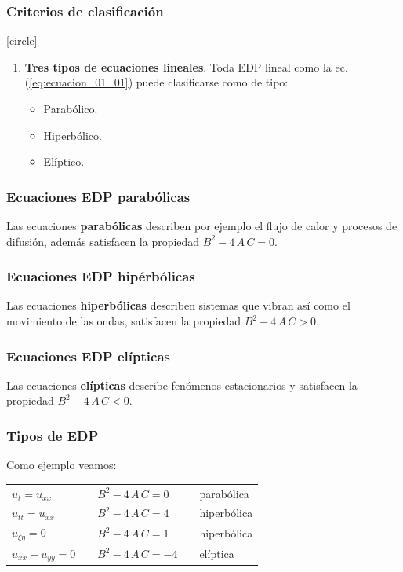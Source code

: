 \documentclass[12pt]{beamer}
\begin{document}
\begin{frame}
\frametitle{Criterios de clasificación}
[circle]
\begin{enumerate}[<+->]    
\conti
\item \textbf{Tres tipos de ecuaciones lineales}. Toda EDP lineal como la ec. (\ref{eq:ecuacion_01_01}) puede clasificarse como de tipo:
\pause
\begin{itemize}[<+->]
\item \large{Parabólico}.
\item \large{Hiperbólico}.
\item \large{Elíptico}.
\end{itemize}
\end{enumerate}
\end{frame}
\begin{frame}
\frametitle{Ecuaciones EDP parabólicas}
Las ecuaciones \textbf{parabólicas} describen por ejemplo el flujo de calor y procesos de difusión, además satisfacen la propiedad $B^{2} - 4 \, A \, C = 0$.
\end{frame}
\begin{frame}
\frametitle{Ecuaciones EDP hipérbólicas}
Las ecuaciones \textbf{hiperbólicas} describen sistemas que vibran así como el movimiento de las ondas, satisfacen la propiedad $B^{2} - 4 \, A \, C > 0$.
\end{frame}
\begin{frame}
\frametitle{Ecuaciones EDP elípticas}
Las ecuaciones \textbf{elípticas} describe fenómenos estacionarios y satisfacen la propiedad $B^{2} - 4 \, A \, C < 0$.
\end{frame}
\begin{frame}
\frametitle{Tipos de EDP}
Como ejemplo veamos:
\pause
\begin{table}[H]
\centering
\begin{tabular}{l l l l l}
\Large{$u_{t} = u_{xx}$} & & \large{$B^{2} - 4 \, A \, C = 0$} & & parabólica \\ \pause
\Large{$u_{tt} = u_{xx}$} & & \large{$B^{2} - 4 \, A \, C = 4$} & & hiperbólica \\ \pause
\Large{$u_{\xi \eta} = 0$} & & \large{$B^{2} - 4 \, A \, C = 1$} & & hiperbólica \\ \pause
\Large{$u_{xx} + u_{yy} = 0$} & & \large{$B^{2} - 4 \, A \, C = -4$} & & elíptica \\
\end{tabular}
\end{table}
\end{frame}
\end{document}
